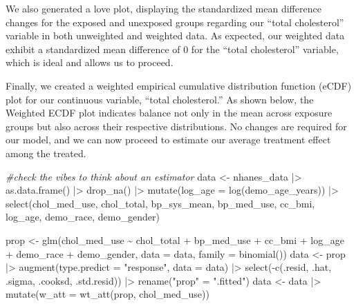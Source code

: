 \documentclass[useAMS,usenatbib,referee]{biom}
\newenvironment{Shaded}{\begin{snugshade}}{\end{snugshade}}
\newcommand{\AttributeTok}[1]{\textcolor[rgb]{0.77,0.63,0.00}{#1}}
\newcommand{\CommentTok}[1]{\textcolor[rgb]{0.56,0.35,0.01}{\textit{#1}}}
\newcommand{\FunctionTok}[1]{\textcolor[rgb]{0.00,0.00,0.00}{#1}}
\newcommand{\NormalTok}[1]{#1}
\newcommand{\OtherTok}[1]{\textcolor[rgb]{0.56,0.35,0.01}{#1}}
\newcommand{\SpecialCharTok}[1]{\textcolor[rgb]{0.00,0.00,0.00}{#1}}
\newcommand{\StringTok}[1]{\textcolor[rgb]{0.31,0.60,0.02}{#1}}
\begin{document}
We also generated a love plot, displaying the standardized mean
difference changes for the exposed and unexposed groups regarding our
``total cholesterol'' variable in both unweighted and weighted data. As
expected, our weighted data exhibit a standardized mean difference of 0
for the ``total cholesterol'' variable, which is ideal and allows us to
proceed.

Finally, we created a weighted empirical cumulative distribution
function (eCDF) plot for our continuous variable, ``total cholesterol.''
As shown below, the Weighted ECDF plot indicates balance not only in the
mean across exposure groups but also across their respective
distributions. No changes are required for our model, and we can now
proceed to estimate our average treatment effect among the treated.

\begin{Shaded}
\begin{Highlighting}[]
\CommentTok{\#check the vibes to think about an estimator}
\NormalTok{data }\OtherTok{\textless{}{-}}\NormalTok{ nhanes\_data }\SpecialCharTok{|\textgreater{}} 
  \FunctionTok{as.data.frame}\NormalTok{() }\SpecialCharTok{|\textgreater{}} 
  \FunctionTok{drop\_na}\NormalTok{() }\SpecialCharTok{|\textgreater{}}
  \FunctionTok{mutate}\NormalTok{(}\AttributeTok{log\_age =} \FunctionTok{log}\NormalTok{(demo\_age\_years)) }\SpecialCharTok{|\textgreater{}}
  \FunctionTok{select}\NormalTok{(chol\_med\_use, chol\_total, bp\_sys\_mean, bp\_med\_use, cc\_bmi, log\_age, demo\_race, demo\_gender)}

\NormalTok{prop }\OtherTok{\textless{}{-}} \FunctionTok{glm}\NormalTok{(chol\_med\_use }\SpecialCharTok{\textasciitilde{}}\NormalTok{ chol\_total }\SpecialCharTok{+}\NormalTok{ bp\_med\_use }\SpecialCharTok{+}\NormalTok{ cc\_bmi }\SpecialCharTok{+}\NormalTok{ log\_age }\SpecialCharTok{+}\NormalTok{ demo\_race }\SpecialCharTok{+}\NormalTok{ demo\_gender, }
    \AttributeTok{data =}\NormalTok{ data,}
    \AttributeTok{family =} \FunctionTok{binomial}\NormalTok{())}
\NormalTok{data }\OtherTok{\textless{}{-}}\NormalTok{ prop }\SpecialCharTok{|\textgreater{}} 
  \FunctionTok{augment}\NormalTok{(}\AttributeTok{type.predict =} \StringTok{"response"}\NormalTok{, }\AttributeTok{data =}\NormalTok{ data)  }\SpecialCharTok{|\textgreater{}}
  \FunctionTok{select}\NormalTok{(}\SpecialCharTok{{-}}\FunctionTok{c}\NormalTok{(.resid, .hat, .sigma, .cooksd, .std.resid)) }\SpecialCharTok{|\textgreater{}}
  \FunctionTok{rename}\NormalTok{(}\StringTok{"prop"} \OtherTok{=} \StringTok{".fitted"}\NormalTok{)}
\NormalTok{data }\OtherTok{\textless{}{-}}\NormalTok{ data }\SpecialCharTok{|\textgreater{}}
  \FunctionTok{mutate}\NormalTok{(}\AttributeTok{w\_att =} \FunctionTok{wt\_att}\NormalTok{(prop, chol\_med\_use)) }
\end{Highlighting}
\end{Shaded}
\end{document}
